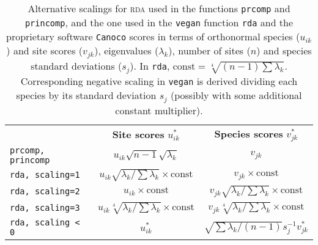 \documentclass[a4paper,10pt]{amsart}
\begin{document}
\begin{table}
  \caption{\label{tab:scales} Alternative scalings for \textsc{rda} used
    in the functions \texttt{prcomp} and \texttt{princomp}, and the
    one used in the \texttt{vegan} function \texttt{rda} 
    and the proprietary software \texttt{Canoco}
    scores in terms of orthonormal species ($u_{ik}$) and site scores
    ($v_{jk}$), eigenvalues ($\lambda_k$), number of sites  ($n$) and
    species standard deviations ($s_j$). In \texttt{rda},
    $\mathrm{const} = \sqrt[4]{(n-1) \sum \lambda_k}$.  Corresponding
    negative scaling in \texttt{vegan}
    is derived
    dividing each  species by its standard deviation $s_j$ (possibly
    with some additional constant multiplier).  }
\begin{tabular}{lcc}
& \textbf{Site scores} $u_{ik}^*$ &
\textbf{Species scores} $v_{jk}^*$ \\
\texttt{prcomp, princomp} &
$u_{ik} \sqrt{n-1} \sqrt{\lambda_k}$ &
$v_{jk}$ \\
\texttt{rda, scaling=1} &
$u_{ik} \sqrt{\lambda_k/ \sum \lambda_k} \times \mathrm{const}$ &
$v_{jk} \times \mathrm{const}$
\\
\texttt{rda, scaling=2} &
$u_{ik} \times \mathrm{const}$ &
$v_{jk} \sqrt{\lambda_k/ \sum \lambda_k} \times \mathrm{const}$  \\
\texttt{rda, scaling=3} &
$u_{ik} \sqrt[4]{\lambda_k/ \sum \lambda_k} \times \mathrm{const}$ &
$v_{jk} \sqrt[4]{\lambda_k/ \sum \lambda_k} \times \mathrm{const}$ \\
\texttt{rda, scaling < 0} &
$u_{ik}^*$ &
$\sqrt{\sum \lambda_k /(n-1)} s_j^{-1} v_{jk}^*$
\end{tabular}
\end{table}
\end{document}
